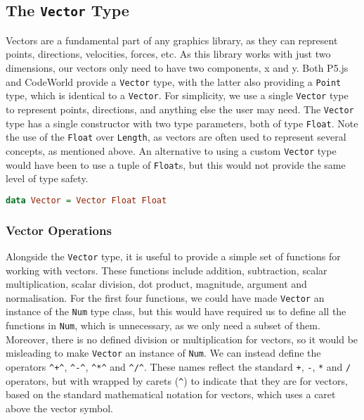 \documentclass[../main.tex]{subfiles}
\begin{document}
        \subsection{The \texttt{Vector}
            Type} Vectors are a fundamental part of any graphics library, as they can
                represent points, directions, velocities, forces, etc. As this library works
                with just two dimensions, our vectors only need to have two components, x and
                y.
            Both P5.js and CodeWorld provide a \texttt{Vector} type, with the latter also
                providing a \texttt{Point} type, which is identical to a \texttt{Vector}.
            For simplicity, we use a single \texttt{Vector} type to represent points,
                directions, and anything else the user may need.
            The \texttt{Vector} type has a single constructor with two type parameters,
                both of type \texttt{Float}.
            Note the use of the \texttt{Float} over \texttt{Length}, as vectors are often
                used to represent several concepts, as mentioned above.
            An alternative to using a custom \texttt{Vector} type would have been to use a
                tuple of \texttt{Float}s, but this would not provide the same level of type
                safety.

            \begin{lstlisting}[language={Haskell}, label={lst:vector}, caption={The \texttt{Vector} 
                type definition.}]
data Vector = Vector Float Float\end{lstlisting}

            \subsubsection{Vector Operations}
                Alongside the \texttt{Vector} type, it is useful to provide a simple set of
                    functions for working with vectors.
                These functions include addition, subtraction, scalar multiplication, scalar
                    division, dot product, magnitude, argument and normalisation.
                For the first four functions, we could have made \texttt{Vector} an instance of
                    the \texttt{Num} type class, but this would have required us to define all the
                    functions in \texttt{Num}, which is unnecessary, as we only need a subset of
                    them.
                Moreover, there is no defined division or multiplication for vectors, so it
                    would be misleading to make \texttt{Vector} an instance of \texttt{Num}.
                We can instead define the operators \verb|^+^|, \verb|^-^|, \verb|^*^| and
                    \verb|^/^|.
                These names reflect the standard \verb|+|, \verb|-|, \verb|*| and \verb|/|
                    operators, but with wrapped by carets (\verb|^|) to indicate that they are for
                    vectors, based on the standard mathematical notation for vectors, which uses a
                    caret above the vector symbol.
\end{document}
